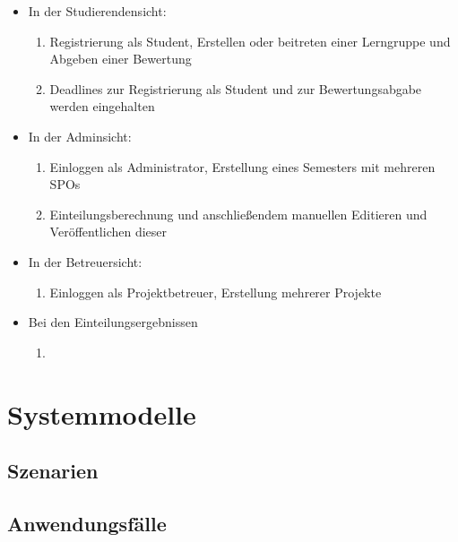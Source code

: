 \documentclass[parskip=full]{scrartcl}
\newcommand{\swtLabel}[1]{\textbf{/#1\arabic*0/}}
\begin{document}
\begin{itemize}
  \item In der Studierendensicht:


\begin{enumerate} [label=\swtLabel{T}]
  
  
  \item Registrierung als Student, Erstellen oder beitreten einer Lerngruppe und Abgeben einer Bewertung
  \item Deadlines zur Registrierung als Student und zur Bewertungsabgabe werden eingehalten
  

\end{enumerate}
  \item In der Adminsicht:
   \begin{enumerate} [label=\swtLabel{T}, resume]
  \item Einloggen als Administrator, Erstellung eines Semesters mit mehreren SPOs
  \item Einteilungsberechnung und anschließendem manuellen Editieren und
  Veröffentlichen dieser
\end{enumerate}
  \item In der Betreuersicht:
   \begin{enumerate} [label=\swtLabel{T}, resume]
  \item Einloggen als Projektbetreuer, Erstellung mehrerer Projekte
\end{enumerate}
  \item Bei den Einteilungsergebnissen
   \begin{enumerate} [label=\swtLabel{T}, resume]
  \item 
\end{enumerate}
\end{itemize}

\section{Systemmodelle}

\subsection{Szenarien}

\subsection{Anwendungsfälle}
\end{document}
